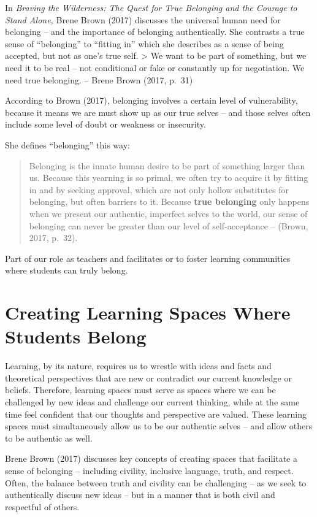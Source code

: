 \documentclass[
]{book}
\begin{document}
In \emph{Braving the Wilderness: The Quest for True Belonging and the Courage to Stand Alone,} Brene Brown (2017) discusses the universal human need for belonging -- and the importance of belonging authentically. She contrasts a true sense of ``belonging'' to ``fitting in'' which she describes as a sense of being accepted, but not as one's true self.
\textgreater{} We want to be part of something, but we need it to be real -- not conditional or fake or constantly up for negotiation. We need true belonging. -- Brene Brown (2017, p.~31)

According to Brown (2017), belonging involves a certain level of vulnerability, because it means we are must show up as our true selves -- and those selves often include some level of doubt or weakness or insecurity.

She defines ``belonging'' this way:

\begin{quote}
Belonging is the innate human desire to be part of something larger than us. Because this yearning is so primal, we often try to acquire it by fitting in and by seeking approval, which are not only hollow substitutes for belonging, but often barriers to it. Because \textbf{true belonging} only happens when we present our authentic, imperfect selves to the world, our sense of belonging can never be greater than our level of self-acceptance -- (Brown, 2017, p.~32).
\end{quote}

Part of our role as teachers and facilitates or to foster learning communities where students can truly belong.

\hypertarget{creating-learning-spaces-where-students-belong}{%
\section{Creating Learning Spaces Where Students Belong}\label{creating-learning-spaces-where-students-belong}}

Learning, by its nature, requires us to wrestle with ideas and facts and theoretical perspectives that are new or contradict our current knowledge or beliefs. Therefore, learning spaces must serve as spaces where we can be challenged by new ideas and challenge our current thinking, while at the same time feel confident that our thoughts and perspective are valued. These learning spaces must simultaneously allow us to be our authentic selves -- and allow others to be authentic as well.

Brene Brown (2017) discusses key concepts of creating spaces that facilitate a sense of belonging -- including civility, inclusive language, truth, and respect. Often, the balance between truth and civility can be challenging -- as we seek to authentically discuss new ideas -- but in a manner that is both civil and respectful of others.
\end{document}
